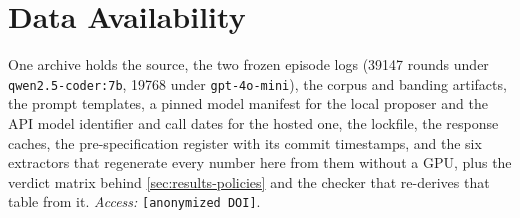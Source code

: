 \section*{Data Availability}
\label{sec:availability}

One archive holds the source, the two frozen episode logs (\num{39147} rounds
under \texttt{qwen2.5-coder:7b}, \num{19768} under \texttt{gpt-4o-mini}), the
corpus and banding artifacts, the prompt templates, a pinned model manifest for
the local proposer and the API model identifier and call dates for the hosted
one, the lockfile, the response caches, the pre-specification register with its
commit timestamps, and the six extractors that regenerate every number here
from them without a GPU, plus the verdict matrix behind
\cref{sec:results-policies} and the checker that re-derives that table from it.
\emph{Access:} \texttt{[anonymized DOI]}.
